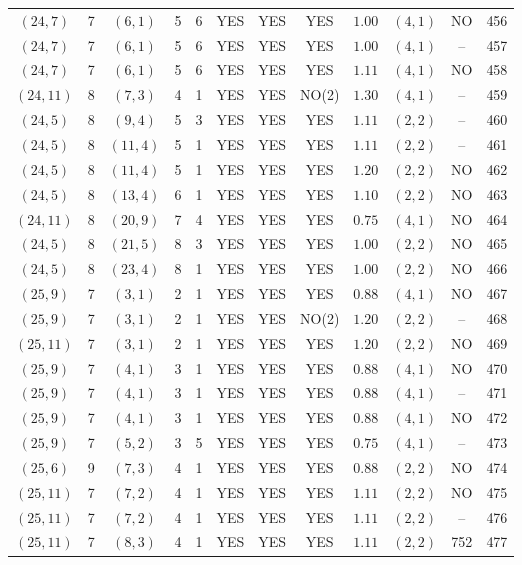 \begin{longtable}{|c|c|c|c|c|c|c|c|c|c|c|c|}
$(24,7)$ & 7 & $(6,1)$ & 5 & 6 & YES & YES & YES & $1.00$ & $(4,1)$ & NO & 456\\
$(24,7)$ & 7 & $(6,1)$ & 5 & 6 & YES & YES & YES & $1.00$ & $(4,1)$ & -- & 457\\
$(24,7)$ & 7 & $(6,1)$ & 5 & 6 & YES & YES & YES & $1.11$ & $(4,1)$ & NO & 458\\
$(24,11)$ & 8 & $(7,3)$ & 4 & 1 & YES & YES & NO(2) & $1.30$ & $(4,1)$ & -- & 459\\
$(24,5)$ & 8 & $(9,4)$ & 5 & 3 & YES & YES & YES & $1.11$ & $(2,2)$ & -- & 460\\
$(24,5)$ & 8 & $(11,4)$ & 5 & 1 & YES & YES & YES & $1.11$ & $(2,2)$ & -- & 461\\
$(24,5)$ & 8 & $(11,4)$ & 5 & 1 & YES & YES & YES & $1.20$ & $(2,2)$ & NO & 462\\
$(24,5)$ & 8 & $(13,4)$ & 6 & 1 & YES & YES & YES & $1.10$ & $(2,2)$ & NO & 463\\
$(24,11)$ & 8 & $(20,9)$ & 7 & 4 & YES & YES & YES & $0.75$ & $(4,1)$ & NO & 464\\
$(24,5)$ & 8 & $(21,5)$ & 8 & 3 & YES & YES & YES & $1.00$ & $(2,2)$ & NO & 465\\
$(24,5)$ & 8 & $(23,4)$ & 8 & 1 & YES & YES & YES & $1.00$ & $(2,2)$ & NO & 466\\
$(25,9)$ & 7 & $(3,1)$ & 2 & 1 & YES & YES & YES & $0.88$ & $(4,1)$ & NO & 467\\
$(25,9)$ & 7 & $(3,1)$ & 2 & 1 & YES & YES & NO(2) & $1.20$ & $(2,2)$ & -- & 468\\
$(25,11)$ & 7 & $(3,1)$ & 2 & 1 & YES & YES & YES & $1.20$ & $(2,2)$ & NO & 469\\
$(25,9)$ & 7 & $(4,1)$ & 3 & 1 & YES & YES & YES & $0.88$ & $(4,1)$ & NO & 470\\
$(25,9)$ & 7 & $(4,1)$ & 3 & 1 & YES & YES & YES & $0.88$ & $(4,1)$ & -- & 471\\
$(25,9)$ & 7 & $(4,1)$ & 3 & 1 & YES & YES & YES & $0.88$ & $(4,1)$ & NO & 472\\
$(25,9)$ & 7 & $(5,2)$ & 3 & 5 & YES & YES & YES & $0.75$ & $(4,1)$ & -- & 473\\
$(25,6)$ & 9 & $(7,3)$ & 4 & 1 & YES & YES & YES & $0.88$ & $(2,2)$ & NO & 474\\
$(25,11)$ & 7 & $(7,2)$ & 4 & 1 & YES & YES & YES & $1.11$ & $(2,2)$ & NO & 475\\
$(25,11)$ & 7 & $(7,2)$ & 4 & 1 & YES & YES & YES & $1.11$ & $(2,2)$ & -- & 476\\
$(25,11)$ & 7 & $(8,3)$ & 4 & 1 & YES & YES & YES & $1.11$ & $(2,2)$ & 752 & 477\\

\end{longtable}
